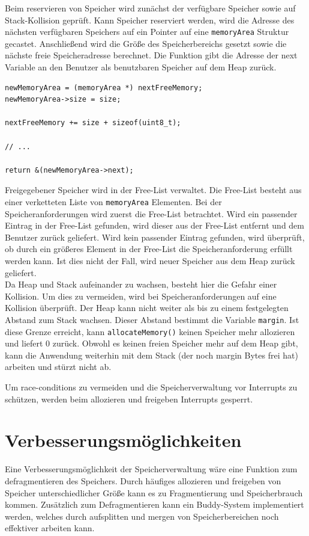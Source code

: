 \documentclass[fontsize=12pt, toc=bibliography, notitlepage]{scrreprt}
\begin{document}
Beim reservieren von Speicher wird zunächst der verfügbare Speicher sowie auf Stack-Kollision geprüft. Kann Speicher reserviert werden, wird die Adresse des nächsten verfügbaren Speichers auf ein Pointer auf eine \lstinline$memoryArea$ Struktur gecastet. Anschließend wird die Größe des Speicherbereichs gesetzt sowie die nächste freie Speicheradresse berechnet. Die Funktion gibt die Adresse der next Variable an den Benutzer als benutzbaren Speicher auf dem Heap zurück.

\begin{lstlisting}[title=memory.c]
newMemoryArea = (memoryArea *) nextFreeMemory;
newMemoryArea->size = size;

nextFreeMemory += size + sizeof(uint8_t);

// ...

return &(newMemoryArea->next);
\end{lstlisting}

Freigegebener Speicher wird in der Free-List verwaltet. Die Free-List besteht aus einer verketteten Liste von \lstinline$memoryArea$ Elementen. Bei der Speicheranforderungen wird zuerst die Free-List betrachtet. Wird ein passender Eintrag in der Free-List gefunden, wird dieser aus der Free-List entfernt und dem Benutzer zurück geliefert. Wird kein passender Eintrag gefunden, wird überprüft, ob durch ein größeres Element in der Free-List die Speicheranforderung erfüllt werden kann. Ist dies nicht der Fall, wird neuer Speicher aus dem Heap zurück geliefert.\\

Da Heap und Stack aufeinander zu wachsen, besteht hier die Gefahr einer Kollision. Um dies zu vermeiden, wird bei Speicheranforderungen auf eine Kollision überprüft. Der Heap kann nicht weiter als bis zu einem festgelegten Abstand zum Stack wachsen. Dieser Abstand bestimmt die Variable \lstinline$margin$. Ist diese Grenze erreicht, kann \lstinline$allocateMemory()$ keinen Speicher mehr allozieren und liefert 0 zurück. Obwohl es keinen freien Speicher mehr auf dem Heap gibt, kann die Anwendung weiterhin mit dem Stack (der noch margin Bytes frei hat) arbeiten und stürzt nicht ab.

Um race-conditions zu vermeiden und die Speicherverwaltung vor Interrupts zu schützen, werden beim allozieren und freigeben Interrupts gesperrt.

\section{Verbesserungsmöglichkeiten}
Eine Verbesserungsmöglichkeit der Speicherverwaltung wäre eine Funktion zum defragmentieren des Speichers. Durch häufiges allozieren und freigeben von Speicher unterschiedlicher Größe kann es zu Fragmentierung und Speicherbrauch kommen. Zusätzlich zum Defragmentieren kann ein Buddy-System implementiert werden, welches durch aufsplitten und mergen von Speicherbereichen noch effektiver arbeiten kann.
\end{document}
